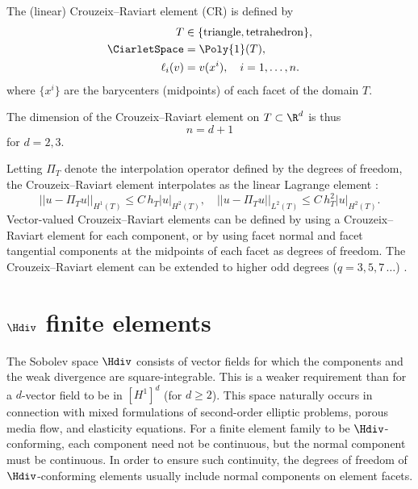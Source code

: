 \begin{definition}
  The (linear) Crouzeix--Raviart element ($\mathrm{CR}$) is defined by
  \begin{align}
    T &\in \{ \mathrm{triangle}{}, \mathrm{tetrahedron}{}\}, \\
    \CiarletSpace &= \Poly{1}(T), \\
    \ell_i(v) &= v(x^i), \quad i = 1, \dots, n.
  \end{align}
  where $\{x^i\}$ are the barycenters (midpoints) of each facet of the
  domain $T$.
\end{definition}
The dimension of the Crouzeix--Raviart element on $T \subset \R^d$ is
thus
\begin{equation}
  n = d + 1
\end{equation}
for $d = 2, 3$.

Letting $\Pi_T$ denote the interpolation operator defined by the
degrees of freedom, the Crouzeix--Raviart element interpolates as the
linear Lagrange element \citep[Chapter 3.I]{Braess2007}:
\begin{equation}
  ||u - \Pi_T u||_{H^1(T)} \leqslant C \, h_T |u|_{H^2(T)}, \quad
  ||u - \Pi_T u||_{L^2(T)} \leqslant C \, h_T^{2} |u|_{H^2(T)}.
\end{equation}
Vector-valued Crouzeix--Raviart elements can be defined by using a
Crouzeix--Raviart element for each component, or by using facet normal
and facet tangential components at the midpoints of each facet as
degrees of freedom. The Crouzeix--Raviart element can be extended to
higher odd degrees ($q=3,5,7\,\ldots$) \citep{CrouzeixFalk1989}.

\section{$\Hdiv$ finite elements}

The Sobolev space $\Hdiv$ consists of vector fields for which the
components and the weak divergence are square-integrable. This is a
weaker requirement than for a $d$-vector field to be in $[H^1]^d$ (for
$d \geqslant 2$). This space naturally occurs in connection with mixed
formulations of second-order elliptic problems, porous media flow, and
elasticity equations. For a finite element family to be
$\Hdiv$-conforming, each component need not be continuous, but the
normal component must be continuous. In order to ensure such
continuity, the degrees of freedom of $\Hdiv$-conforming elements
usually include normal components on element facets.

